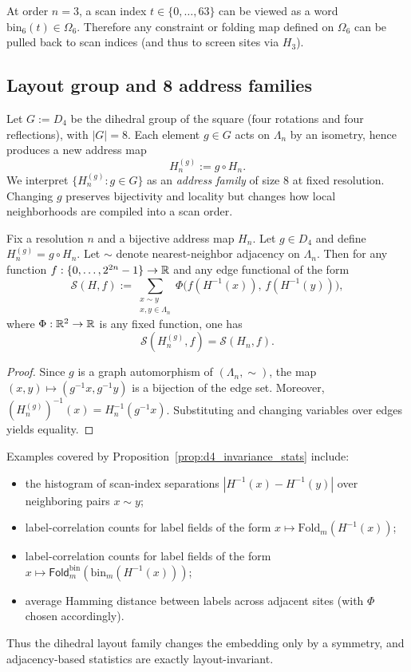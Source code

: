 \begin{remark}
At order $n=3$, a scan index $t\in\{0,\dots,63\}$ can be viewed as a word $\mathrm{bin}_6(t)\in\Omega_6$.
Therefore any constraint or folding map defined on $\Omega_6$ can be pulled back to scan indices (and thus to screen sites via $H_3$).
\end{remark}

\subsection{Layout group and 8 address families}
Let $G:=D_4$ be the dihedral group of the square (four rotations and four reflections), with $|G|=8$.
Each element $g\in G$ acts on $\Lambda_n$ by an isometry, hence produces a new address map
\[
H_n^{(g)}:=g\circ H_n.
\]
We interpret $\{H_n^{(g)}:g\in G\}$ as an \emph{address family} of size $8$ at fixed resolution.
Changing $g$ preserves bijectivity and locality but changes how local neighborhoods are compiled into a scan order.

\begin{proposition}
\label{prop:d4_invariance_stats}
Fix a resolution $n$ and a bijective address map $H_n$.
Let $g\in D_4$ and define $H_n^{(g)}=g\circ H_n$.
Let $\sim$ denote nearest-neighbor adjacency on $\Lambda_n$.
Then for any function $f:\{0,\dots,2^{2n}-1\}\to\mathbb{R}$ and any edge functional of the form
\[
\mathcal{S}(H,f):=\sum_{\substack{x\sim y\\ x,y\in\Lambda_n}}
\Phi\!\bigl(f(H^{-1}(x)),\,f(H^{-1}(y))\bigr),
\]
where $\Phi:\mathbb{R}^2\to\mathbb{R}$ is any fixed function, one has
\[
\mathcal{S}(H_n^{(g)},f)=\mathcal{S}(H_n,f).
\]
\end{proposition}

\begin{proof}
Since $g$ is a graph automorphism of $(\Lambda_n,\sim)$, the map $(x,y)\mapsto(g^{-1}x,g^{-1}y)$ is a bijection of the edge set.
Moreover, $(H_n^{(g)})^{-1}(x)=H_n^{-1}(g^{-1}x)$.
Substituting and changing variables over edges yields equality.
\end{proof}

\begin{remark}
Examples covered by Proposition~\ref{prop:d4_invariance_stats} include:
\begin{itemize}
\item the histogram of scan-index separations $|H^{-1}(x)-H^{-1}(y)|$ over neighboring pairs $x\sim y$;
\item label-correlation counts for label fields of the form $x\mapsto \mathrm{Fold}_m(H^{-1}(x))$;
\item label-correlation counts for label fields of the form $x\mapsto \mathsf{Fold}^{\mathrm{bin}}_m(\mathrm{bin}_m(H^{-1}(x)))$;
\item average Hamming distance between labels across adjacent sites (with $\Phi$ chosen accordingly).
\end{itemize}
Thus the dihedral layout family changes the embedding only by a symmetry, and adjacency-based statistics are exactly layout-invariant.
\end{remark}

